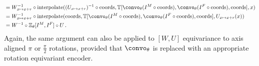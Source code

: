 \begin{equation}
\begin{split}
        & = W_{x \mapsto x + r}^{-1} \circ \text{interpolate}((U_{x \mapsto x + r})^{-1} \circ \text{coords},  \mathbb{T}[\convo_\theta (I^M\circ \text{coords}), \convo_\theta(I^F\circ \text{coords}), \text{coords} ], x) \\
        & = W_{x \mapsto x + r}^{-1} \circ \text{interpolate}(\text{coords},  \mathbb{T}[\convo_\theta (I^M\circ \text{coords}), \convo_\theta(I^F\circ \text{coords}), \text{coords} ], U_{x \mapsto x + r} (x)) \\
		& =  W^{-1} \circ \Xi_\theta[ I^M , I^F] \circ U\,.
	\end{split}
\end{equation}
Again, the same argument can also be applied to $[W, U]$ equivariance to axis aligned $\pi$ or $\frac{\pi}{2}$ rotations, provided that $\convo_\theta$ is replaced with an appropriate rotation equivariant encoder.

